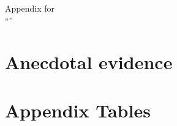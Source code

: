

\begin{center}
	{ \Large Appendix for \\ ``\tit''}
\end{center}

\setcounter{table}{0}
\renewcommand{\thetable}{A\arabic{table}}

\singlespacing






\section{Anecdotal evidence}\label{app:anecdotal}
 







\section*{Appendix Tables}
\label{app:tables}
  

 
 